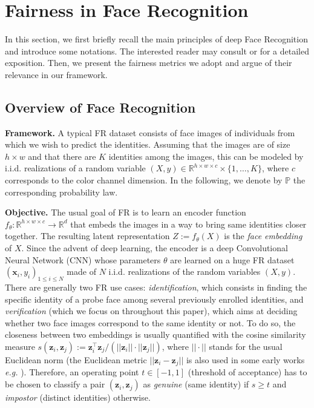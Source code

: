 \documentclass[nohyperref]{article}
\theoremstyle{plain}
\theoremstyle{definition}
\theoremstyle{remark}
\newcommand{\vect}[1]{{\bm{#1}}}
\begin{document}
 
\section{Fairness in Face Recognition}

In this section, we first briefly recall the main principles of deep Face Recognition and introduce some notations. The interested reader may consult \cite{survey_FR} or \cite{survey_FR2} for a detailed exposition. Then, we present the fairness metrics we adopt and argue of their relevance in our framework.

\subsection{Overview of Face Recognition}\label{subsec:FR_survey}

{\bf Framework.} A typical FR dataset consists of face images of individuals from which we wish to predict the identities. Assuming that the images are of size $h \times w$ and that there are $K$ identities among the images, this can be modeled by i.i.d. realizations of a random variable $(X,y) \in \mathbb{R}^{h \times w \times c} \times \{1, \ldots, K \}$, where $c$ corresponds to the color channel dimension. In the following, we denote by $\mathbb{P}$ the corresponding probability law.

{\bf Objective.} The usual goal of FR is to learn an encoder function $f_\theta: \mathbb{R}^{h \times w \times c} \rightarrow \mathbb{R}^d$ that embeds the images in a way to bring same identities closer together. The resulting latent representation $Z := f_\theta(X)$ is the {\it face embedding} of $X$. Since the advent of deep learning, the encoder is a deep Convolutional Neural Network (CNN) whose parameters $\theta$ are learned on a huge FR dataset $(\vect{x}_i, y_i)_{1 \leq i \leq N}$ made of $N$ i.i.d. realizations of the random variables $(X,y)$. There are generally two FR use cases: {\it identification}, which consists in finding the specific identity of a probe face among several previously enrolled identities, and {\it verification} (which we focus on throughout this paper), which aims at deciding whether two face images correspond to the same identity or not. To do so, the closeness between two embeddings is usually quantified with the cosine similarity measure $s(\vect{z}_i, \vect{z}_j) := \vect{z}_i^\intercal \vect{z}_j / ( || \vect{z}_i || \cdot || \vect{z}_j ||)$, where $|| \cdot ||$ stands for the usual Euclidean norm (the Euclidean metric $|| \vect{z}_i - \vect{z}_j ||$ is also used in some early works {\it e.g.} \cite{facenet}). Therefore, an operating point $t \in [-1, 1]$ (threshold of acceptance) has to be chosen to classify a pair $(\vect{z}_i, \vect{z}_j)$ as {\it genuine} (same identity) if $s \geq t$ and {\it impostor} (distinct identities) otherwise.
\end{document}
